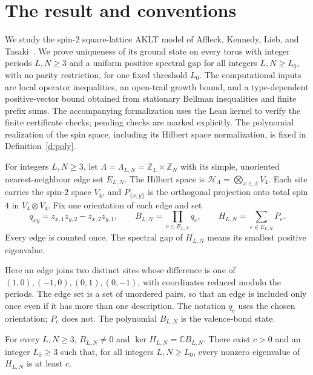 \section{The result and conventions}\label{s:result}

We study the spin-\(2\) square-lattice AKLT model of Affleck, Kennedy,
Lieb, and Tasaki~\cite{AKLT88,KLT88}. We prove uniqueness of its ground
state on every torus with integer periods \(L,N\ge3\) and a uniform
positive spectral gap for all integers \(L,N\ge L_0\), with no parity
restriction, for one fixed threshold \(L_0\). The computational inputs
are local operator inequalities, an open-trail growth bound, and a
type-dependent positive-vector bound obtained from stationary Bellman
inequalities and finite prefix sums. The accompanying formalization
uses the Lean kernel to verify the finite certificate checks; pending
checks are marked explicitly. The polynomial realization of the spin space,
including its Hilbert space normalization, is fixed in
Definition~\ref{d:poly}.

\begin{definition}\label{d:model}
For integers \(L,N\ge3\), let \(\Lambda=\Lambda_{L,N}=\mathbb Z_L\times\mathbb Z_N\)
with its simple, unoriented nearest-neighbour edge set \(E_{L,N}\).
The Hilbert space is \(\mathcal H_\Lambda=\bigotimes_{x\in\Lambda}V_4\).
Each site carries the spin-\(2\) space \(V_4\), and \(P_{\{x,y\}}\)
is the orthogonal projection onto total spin \(4\) in \(V_4\otimes V_4\).
Fix one orientation of each edge and set
\[
 q_{xy}=z_{x,1}z_{y,2}-z_{x,2}z_{y,1},\qquad
 B_{L,N}=\prod_{e\in E_{L,N}}q_e,\qquad
 H_{L,N}=\sum_{e\in E_{L,N}}P_e.
\]
Every edge is counted once. The spectral gap of \(H_{L,N}\) means its
smallest positive eigenvalue.
\end{definition}

Here an edge joins two distinct sites whose difference is one of
\((1,0),(-1,0),(0,1),(0,-1)\), with coordinates reduced modulo the
periods. The edge set is a set of unordered pairs, so that an edge
is included only once even if it has more than one description.
The notation \(q_e\) uses the chosen orientation; \(P_e\) does not.
The polynomial \(B_{L,N}\) is the valence-bond state.

\begin{theorem}\label{t:main}
For every \(L,N\ge3\), \(B_{L,N}\ne0\) and
\(\ker H_{L,N}=\mathbb C B_{L,N}\).
There exist \(c>0\) and an integer \(L_0\ge3\) such that, for all
integers \(L,N\ge L_0\), every nonzero eigenvalue of \(H_{L,N}\)
is at least \(c\).
\end{theorem}

